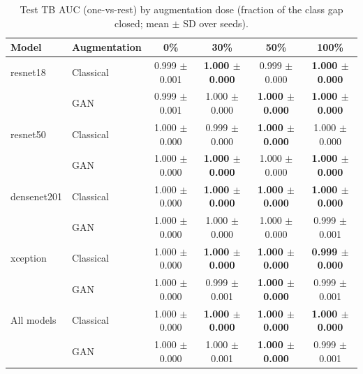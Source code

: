 \begin{table}[htbp]
\centering
\caption{Test TB AUC (one-vs-rest) by augmentation dose (fraction of the class gap closed; mean $\pm$ SD over seeds).}
\label{tab:dose_tb_auc}
\begin{tabular}{llcccc}
\toprule
Model & Augmentation & 0\% & 30\% & 50\% & 100\% \\
\midrule
resnet18 & Classical & 0.999 $\pm$ 0.001 & \textbf{1.000 $\pm$ 0.000} & 0.999 $\pm$ 0.000 & \textbf{1.000 $\pm$ 0.000} \\
 & GAN & 0.999 $\pm$ 0.001 & 1.000 $\pm$ 0.000 & \textbf{1.000 $\pm$ 0.000} & \textbf{1.000 $\pm$ 0.000} \\
\addlinespace
resnet50 & Classical & 1.000 $\pm$ 0.000 & 0.999 $\pm$ 0.000 & \textbf{1.000 $\pm$ 0.000} & 1.000 $\pm$ 0.000 \\
 & GAN & 1.000 $\pm$ 0.000 & \textbf{1.000 $\pm$ 0.000} & 1.000 $\pm$ 0.000 & \textbf{1.000 $\pm$ 0.000} \\
\addlinespace
densenet201 & Classical & 1.000 $\pm$ 0.000 & \textbf{1.000 $\pm$ 0.000} & \textbf{1.000 $\pm$ 0.000} & \textbf{1.000 $\pm$ 0.000} \\
 & GAN & 1.000 $\pm$ 0.000 & 1.000 $\pm$ 0.000 & 1.000 $\pm$ 0.000 & 0.999 $\pm$ 0.001 \\
\addlinespace
xception & Classical & 1.000 $\pm$ 0.000 & \textbf{1.000 $\pm$ 0.000} & \textbf{1.000 $\pm$ 0.000} & \textbf{0.999 $\pm$ 0.000} \\
 & GAN & 1.000 $\pm$ 0.000 & 0.999 $\pm$ 0.001 & \textbf{1.000 $\pm$ 0.000} & 0.999 $\pm$ 0.001 \\
\addlinespace
All models & Classical & 1.000 $\pm$ 0.000 & \textbf{1.000 $\pm$ 0.000} & \textbf{1.000 $\pm$ 0.000} & \textbf{1.000 $\pm$ 0.000} \\
 & GAN & 1.000 $\pm$ 0.000 & 1.000 $\pm$ 0.001 & \textbf{1.000 $\pm$ 0.000} & 0.999 $\pm$ 0.001 \\
\bottomrule
\end{tabular}
\end{table}